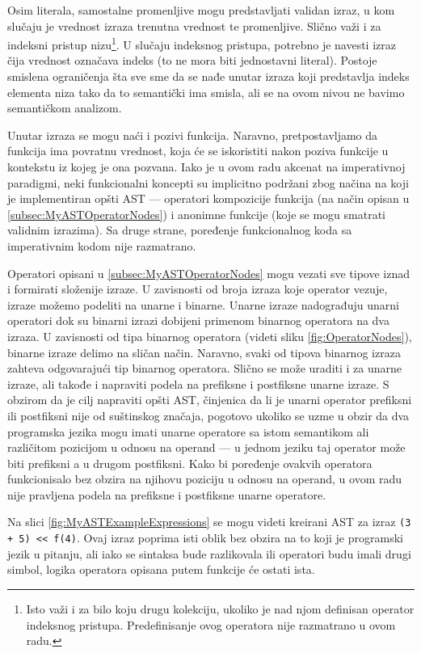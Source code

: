 Osim literala, samostalne promenljive mogu predstavljati validan izraz, u kom slučaju je vrednost izraza trenutna vrednost te promenljive. Slično važi i za indeksni pristup nizu\footnote{Isto važi i za bilo koju drugu kolekciju, ukoliko je nad njom definisan operator indeksnog pristupa. Predefinisanje ovog operatora nije razmatrano u ovom radu.}. U slučaju indeksnog pristupa, potrebno je navesti izraz čija vrednost označava indeks (to ne mora biti jednostavni literal). Postoje smislena ograničenja šta sve sme da se nađe unutar izraza koji predstavlja indeks elementa niza tako da to semantički ima smisla, ali se na ovom nivou ne bavimo semantičkom analizom. 

Unutar izraza se mogu naći i pozivi funkcija. Naravno, pretpostavljamo da funkcija ima povratnu vrednost, koja će se iskoristiti nakon poziva funkcije u kontekstu iz kojeg je ona pozvana. Iako je u ovom radu akcenat na imperativnoj paradigmi, neki funkcionalni koncepti su implicitno podržani zbog načina na koji je implementiran opšti AST --- operatori kompozicije funkcija (na način opisan u \ref{subsec:MyASTOperatorNodes}) i anonimne funkcije (koje se mogu smatrati validnim izrazima). Sa druge strane, poređenje funkcionalnog koda sa imperativnim kodom nije razmatrano. 

Operatori opisani u \ref{subsec:MyASTOperatorNodes} mogu vezati sve tipove iznad i formirati složenije izraze. U zavisnosti od broja izraza koje operator vezuje, izraze možemo podeliti na unarne i binarne. Unarne izraze nadograđuju unarni operatori dok su binarni izrazi dobijeni primenom binarnog operatora na dva izraza. U zavisnosti od tipa binarnog operatora (videti sliku \ref{fig:OperatorNodes}), binarne izraze delimo na sličan način. Naravno, svaki od tipova binarnog izraza zahteva odgovarajući tip binarnog operatora. Slično se može uraditi i za unarne izraze, ali takođe i napraviti podela na prefiksne i postfiksne unarne izraze. S obzirom da je cilj napraviti opšti AST, činjenica da li je unarni operator prefiksni ili postfiksni nije od suštinskog značaja, pogotovo ukoliko se uzme u obzir da dva programska jezika mogu imati unarne operatore sa istom semantikom ali različitom pozicijom u odnosu na operand --- u jednom jeziku taj operator može biti prefiksni a u drugom postfiksni. Kako bi poređenje ovakvih operatora funkcionisalo bez obzira na njihovu poziciju u odnosu na operand, u ovom radu nije pravljena podela na prefiksne i postfiksne unarne operatore.

Na slici \ref{fig:MyASTExampleExpressions} se mogu videti kreirani AST za izraz \texttt{(3 + 5) << f(4)}. Ovaj izraz poprima isti oblik bez obzira na to koji je programski jezik u pitanju, ali iako se sintaksa bude razlikovala ili operatori budu imali drugi simbol, logika operatora opisana putem funkcije će ostati ista.

